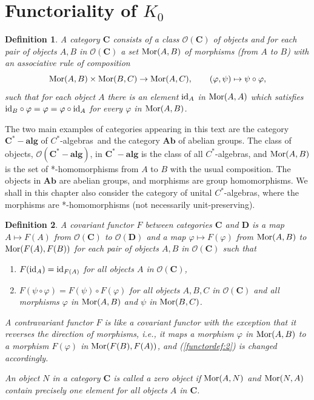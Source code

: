 \documentclass{book}
\newtheorem{definition}{Definition}[section]
\def\cstars{\(C^*\)-algebras}
\begin{document}
\section{Functoriality of \texorpdfstring{\(K_0\)}{K0}}\label{sec:622}
\begin{definition}
  A \textnormal{category} \(\mathbf{C}\) consists of a class \(\mathbf{\mathcal{O}(C)}\) of \textnormal{objects}
  and for each pair of objects \(A, B\) in \(\mathbf{\mathcal{O}(C)}\) a set \(\textnormal{Mor}(A,B)\) of \textnormal{morphisms} (from \(A\) to \(B\)) with an 
  associative rule of composition
  \[
    \textnormal{Mor}(A,B)\times\textnormal{Mor}(B,C)\rightarrow \textnormal{Mor}(A,C), \qquad (\varphi, \psi)\mapsto\psi\circ\varphi,
  \]
  such that for each object \(A\) there is an element \(\textnormal{id}_A\) in \(\textnormal{Mor}(A,A)\) which satisfies
  \(\textnormal{id}_B\circ\varphi=\varphi=\varphi\circ{\textnormal{id}}_A\) for every \(\varphi\) in \(\textnormal{Mor}(A,B)\).
\end{definition}
The two main examples of categories appearing in this text are the category \(\mathbf{C^*-alg}\) of \cstars\ and the category \(\mathbf{Ab}\) of abelian groups.
The class of objects, \(\mathbf{\mathcal{O}(C^*-alg)}\), in \(\mathbf{C^*-alg}\) is the class of all \cstars, and \(\textnormal{Mor}(A,B)\) is the set of *-homomorphisms 
from \(A\) to \(B\) with the usual composition. The objects in \(\mathbf{Ab}\) are abelian groups, and morphisms are group homomorphisms.
We shall in this chapter also consider the category of unital \cstars, where the morphisms are *-homomorphisms (not necessarily unit-preserving).
\begin{definition}
  A \textnormal{covariant functor} \(F\) between categories \(\mathbf{C}\) and \(\mathbf{D}\) is a map \(A\mapsto F(A)\)
  from \(\mathbf{\mathcal{O}(C)}\) to \(\mathbf{\mathcal{O}(D)}\) and a map \(\varphi\mapsto F(\varphi)\) from 
  \(\textnormal{Mor}(A,B)\) to \(\textnormal{Mor}(F(A),F(B))\) for each pair of objects \(A, B\) in \(\mathbf{\mathcal{O}(C)}\) such that
  \begin{enumerate}
    \item \(F(\textnormal{id}_A)=\textnormal{id}_{F(A)}\) for all objects \(A\) in \(\mathbf{\mathcal{O}(C)}\),
    \item\label{functordef:2} \(F(\psi\circ\varphi)=F(\psi)\circ F(\varphi)\) for all objects \(A, B, C\) in \(\mathbf{\mathcal{O}(C)}\) and all morphisms \(\varphi\) in \(\textnormal{Mor}(A,B)\) and \(\psi\) in \(\textnormal{Mor}(B,C)\).
  \end{enumerate}\par
  A \textnormal{contravariant functor} \(F\) is like a covariant functor with the exception that it reverses the direction of morphisms, i.e., it maps a morphism \(\varphi\) 
  in \(\textnormal{Mor}(A,B)\) to a morphism \(F(\varphi)\) in \(\textnormal{Mor}(F(B),F(A))\), and (\ref{functordef:2})
  is changed accordingly.\par
  An object \(N\) in a category \(\mathbf{C}\) is called a \textnormal{zero object} if \(\textnormal{Mor}(A,N)\) and \(\textnormal{Mor}(N,A)\) contain precisely
  one element for all objects \(A\) in \(\mathbf{C}\).
\end{definition}
\end{document}

